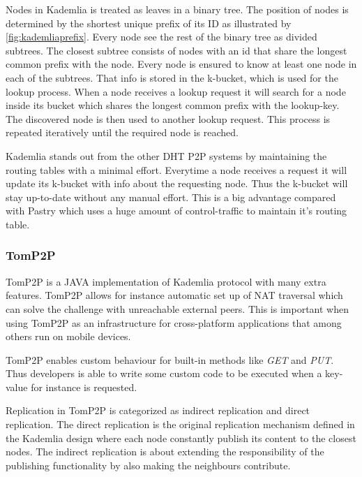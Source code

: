 Nodes in Kademlia is treated as leaves in a binary tree. The position of nodes is determined by the shortest unique prefix of its ID as illustrated by \autoref{fig:kademliaprefix}. Every node see the rest of the binary tree as divided subtrees. The closest subtree consists of nodes with an id that share the longest common prefix with the node. Every node is ensured to know at least one node in each of the subtrees. That info is stored in the k-bucket, which is used for the lookup process. When a node receives a lookup request it will search for a node inside its bucket which shares the longest common prefix with the lookup-key. The discovered node is then used to another lookup request. This process is repeated iteratively until the required node is reached.

Kademlia stands out from the other DHT P2P systems by maintaining the routing tables with a minimal effort. Everytime a node receives a request it will update its k-bucket with info about the requesting node. Thus the k-bucket will stay up-to-date without any manual effort. This is a big advantage compared with Pastry which uses a huge amount of control-traffic to maintain it's routing table.



\subsubsection{TomP2P}
TomP2P is a JAVA implementation of Kademlia protocol with many extra features. TomP2P allows for instance automatic set up of NAT traversal which can solve the challenge with unreachable external peers. This is important when using TomP2P as an infrastructure for cross-platform applications that among others run on mobile devices.

TomP2P enables custom behaviour for built-in methods like \emph{GET} and \emph{PUT}. Thus developers is able to write some custom code to be executed when a key-value for instance is requested.

Replication in TomP2P is categorized as indirect replication and direct replication. The direct replication is the original replication mechanism defined in the Kademlia design where each node constantly publish its content to the closest nodes. The indirect replication is about extending the responsibility of the publishing functionality by also making the neighbours contribute.
    
